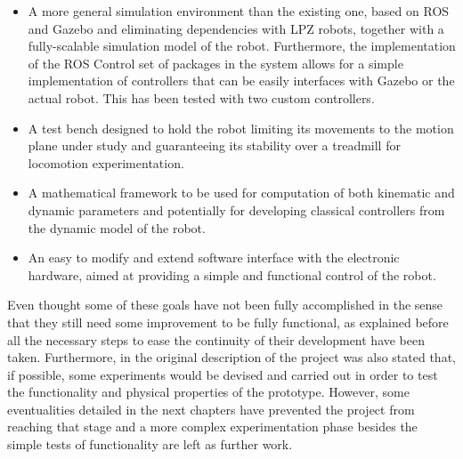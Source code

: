 \begin{itemize}
\label{list:goals}
\item A more general simulation environment than the existing one, based on ROS and Gazebo and eliminating dependencies with LPZ robots, together with a fully-scalable simulation model of the robot. Furthermore, the implementation of the ROS Control set of packages \cite{ros_control} in the system allows for a simple implementation of controllers that can be easily interfaces with Gazebo or the actual robot. This has been tested with two custom controllers.
\item A test bench designed to hold the robot limiting its movements to the motion plane under study and guaranteeing its stability over a treadmill for locomotion experimentation. 
\item A mathematical framework to be used for computation of both kinematic and dynamic parameters and potentially for developing classical controllers from the dynamic model of the robot.
\item An easy to modify and extend software interface with the electronic hardware, aimed at providing a simple and functional control of the robot.
\end{itemize}

Even thought some of these goals have not been fully accomplished in the sense that they still need some improvement to be fully functional, as explained before all the necessary steps to ease the continuity of their development have been taken.
Furthermore, in the original description of the project was also stated that, if possible, some experiments would be devised and carried out in order to test the functionality and physical properties of the prototype. 
However, some eventualities detailed in the next chapters have prevented the project from reaching that stage and a more complex experimentation phase besides the simple tests of functionality are left as further work.

